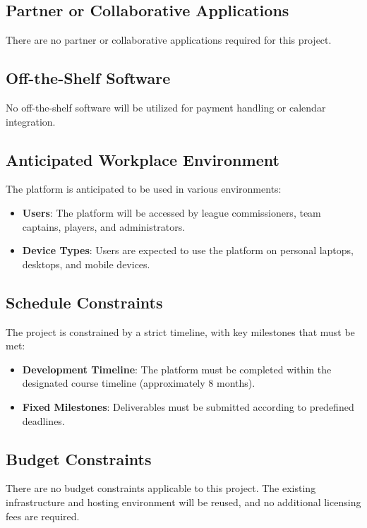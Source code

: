 \documentclass[12pt]{article}
\begin{document}
\subsection{Partner or Collaborative Applications}
There are no partner or collaborative applications required for this project.

\subsection{Off-the-Shelf Software}
No off-the-shelf software will be utilized for payment handling or calendar integration.

\subsection{Anticipated Workplace Environment}
The platform is anticipated to be used in various environments:
\begin{itemize}
    \item \textbf{Users}: The platform will be accessed by league commissioners, team captains, players, and administrators.
    \item \textbf{Device Types}: Users are expected to use the platform on personal laptops, desktops, and mobile devices.
\end{itemize}

\subsection{Schedule Constraints}
The project is constrained by a strict timeline, with key milestones that must be met:
\begin{itemize}
    \item \textbf{Development Timeline}: The platform must be completed within the designated course timeline (approximately 8 months).
    \item \textbf{Fixed Milestones}: Deliverables must be submitted according to predefined deadlines.
\end{itemize}

\subsection{Budget Constraints}
There are no budget constraints applicable to this project. The existing infrastructure and hosting environment will be reused, and no additional licensing fees are required.
\end{document}
